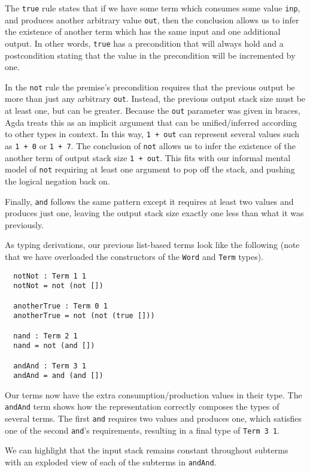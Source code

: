 \documentclass[runningheads,a4paper]{llncs}
\begin{document}
The \texttt{true} rule states that if we have some term which consumes some
value \texttt{inp}, and produces another arbitrary value \texttt{out},
then the conclusion allows us to infer the existence of another term
which has the same input and one additional output. In other words,
\texttt{true} has a precondition that will always hold and a
postcondition stating that the value in the precondition will be
incremented by one.

In the \texttt{not} rule the premise's precondition requires that the previous output
be more than just any arbitrary \texttt{out}. Instead, the previous output
stack size must be at least one, but can be greater. Because the
\texttt{out} parameter was given in braces, Agda treats this as an
implicit argument that can be unified/inferred according to other
types in context. In this way, \texttt{1 + out} can represent several
values such as \texttt{1 + 0} or \texttt{1 + 7}. The conclusion of
\texttt{not} allows us to infer the existence of the another term of
output stack size \texttt{1 + out}. This fits with our informal mental
model of \texttt{not} requiring at least one argument to pop off the
stack, and pushing the logical negation back on.

Finally, \texttt{and} follows the same pattern except it requires at
least two values and produces just one, leaving the output stack size exactly
one less than what it was previously.

As typing derivations, our previous list-based terms look like
the following (note that we have overloaded the constructors of the
\texttt{Word} and \texttt{Term} types).

\begin{verbatim}
  notNot : Term 1 1
  notNot = not (not [])

  anotherTrue : Term 0 1
  anotherTrue = not (not (true []))

  nand : Term 2 1
  nand = not (and [])

  andAnd : Term 3 1
  andAnd = and (and [])
\end{verbatim}

Our terms now have the extra consumption/production values in their
type. The \texttt{andAnd} term shows how the representation correctly
composes the types of several terms. The first \texttt{and} requires
two values and produces one, which satisfies one of the second
\texttt{and}'s requirements, resulting in a final type of
\texttt{Term 3 1}.

We can highlight that the input stack remains constant throughout
subterms with an exploded view of each of the subterms in
\texttt{andAnd}.
\end{document}
